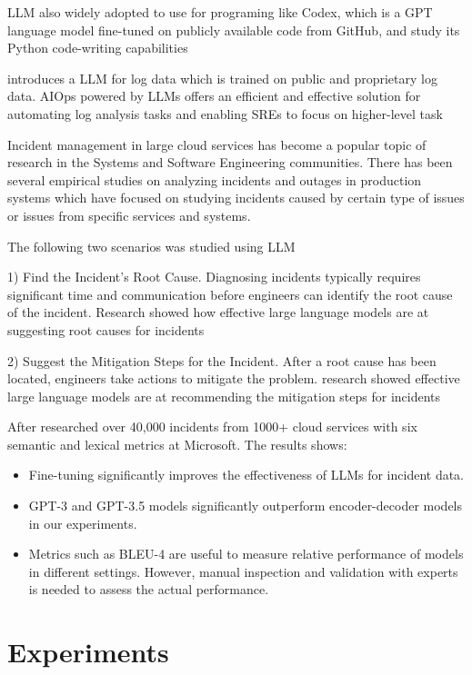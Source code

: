 \documentclass[conference]{IEEEtran}
\begin{document}
LLM also widely adopted to use for programing like Codex, which is a GPT language model fine-tuned on publicly available code from
GitHub, and study its Python code-writing capabilities \cite{chen2021evaluating}

introduces a LLM for log data which is trained on public and proprietary log data.
AIOps powered by LLMs offers an efficient and effective solution for automating log analysis tasks and enabling SREs to focus on higher-level task\cite{gupta2023learning}

Incident management in large cloud services has become a popular topic of research in the Systems and Software Engineering communities.  There has been several empirical studies on analyzing incidents and outages in production systems which have focused on studying incidents caused by certain type of issues or issues from specific services and systems.\cite{10172904} 

The following two scenarios was studied using LLM \cite{10172904} 

1) Find the Incident's Root Cause. Diagnosing incidents typically requires significant time and communication before engineers can identify the root cause of the incident. Research showed how effective large language models are at suggesting root causes for incidents\cite{10172904} 

2) Suggest the Mitigation Steps for the Incident. After a root cause has been located, engineers take actions to mitigate the problem. research showed effective large language models are at recommending the mitigation steps for incidents\cite{10172904} 

After researched over 40,000 incidents from 1000+ cloud services with six semantic and lexical metrics at Microsoft.\cite{10172904}  The results shows:
\begin{itemize}
    \item Fine-tuning significantly improves the effectiveness of LLMs for incident data.
    \item GPT-3 and GPT-3.5 models significantly outperform encoder-decoder models in our experiments.
    \item Metrics such as BLEU-4 are useful to measure relative performance of models in different settings. However, manual inspection and validation with experts is needed to assess the actual performance.
\end{itemize}

\section{Experiments}
\end{document}
